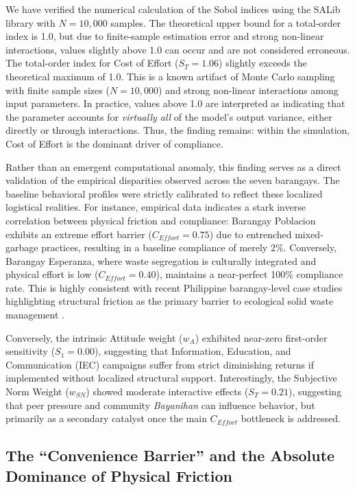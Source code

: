 We have verified the numerical calculation of the Sobol indices using the SALib library with $N = 10,000$ samples. The theoretical upper bound for a total‑order index is 1.0, but due to finite‑sample estimation error and strong non‑linear interactions, values slightly above 1.0 can occur and are not considered erroneous. The total-order index for Cost of Effort ($S_T = 1.06$) slightly exceeds the theoretical maximum of 1.0. This is a known artifact of Monte Carlo sampling with finite sample sizes ($N = 10,000$) and strong non-linear interactions among input parameters. In practice, values above 1.0 are interpreted as indicating that the parameter accounts for \textit{virtually all} of the model's output variance, either directly or through interactions. Thus, the finding remains: within the simulation, Cost of Effort is the dominant driver of compliance.

Rather than an emergent computational anomaly, this finding serves as a direct validation of the empirical disparities observed across the seven barangays. The baseline behavioral profiles were strictly calibrated to reflect these localized logistical realities. For instance, empirical data indicates a stark inverse correlation between physical friction and compliance: Barangay Poblacion exhibits an extreme effort barrier ($C_{Effort} = 0.75$) due to entrenched mixed-garbage practices, resulting in a baseline compliance of merely 2\%. Conversely, Barangay Esperanza, where waste segregation is culturally integrated and physical effort is low ($C_{Effort} = 0.40$), maintains a near-perfect 100\% compliance rate. This is highly consistent with recent Philippine barangay-level case studies highlighting structural friction as the primary barrier to ecological solid waste management \citep{Yazawa2025}.

Conversely, the intrinsic Attitude weight ($w_{A}$) exhibited near-zero first-order sensitivity ($S_1 = 0.00$), suggesting that Information, Education, and Communication (IEC) campaigns suffer from strict diminishing returns if implemented without localized structural support. Interestingly, the Subjective Norm Weight ($w_{SN}$) showed moderate interactive effects ($S_T = 0.21$), suggesting that peer pressure and community \textit{Bayanihan} can influence behavior, but primarily as a secondary catalyst once the main $C_{Effort}$ bottleneck is addressed.

\subsection{The ``Convenience Barrier'' and the Absolute Dominance of Physical Friction}

